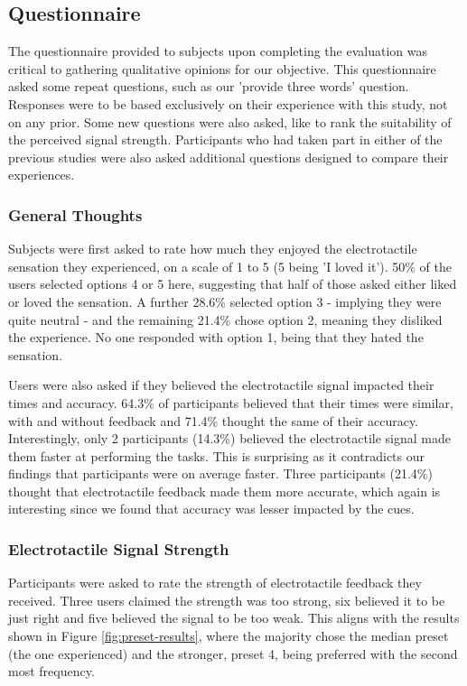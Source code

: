 \documentclass{mpaper}
\begin{document}
\subsection{Questionnaire} \label{subsec:questionnaire-3}
The questionnaire provided to subjects upon completing the evaluation was critical to gathering qualitative opinions for our objective. This questionnaire asked some repeat questions, such as our 'provide three words' question. Responses were to be based exclusively on their experience with this study, not on any prior. Some new questions were also asked, like to rank the suitability of the perceived signal strength. Participants who had taken part in either of the previous studies were also asked additional questions designed to compare their experiences.

\subsubsection{General Thoughts}

Subjects were first asked to rate how much they enjoyed the electrotactile sensation they experienced, on a scale of 1 to 5 (5 being 'I loved it'). 50\% of the users selected options 4 or 5 here, suggesting that half of those asked either liked or loved the sensation. A further 28.6\% selected option 3 - implying they were quite neutral - and the remaining 21.4\% chose option 2, meaning they disliked the experience. No one responded with option 1, being that they hated the sensation.

Users were also asked if they believed the electrotactile signal impacted their times and accuracy. 64.3\% of participants believed that their times were similar, with and without feedback and 71.4\% thought the same of their accuracy. Interestingly, only 2 participants (14.3\%) believed the electrotactile signal made them faster at performing the tasks. This is surprising as it contradicts our findings that participants were on average faster. Three participants (21.4\%) thought that electrotactile feedback made them more accurate, which again is interesting since we found that accuracy was lesser impacted by the cues.

\subsubsection{Electrotactile Signal Strength}
Participants were asked to rate the strength of electrotactile feedback they received. Three users claimed the strength was too strong, six believed it to be just right and five believed the signal to be too weak. This aligns with the results shown in Figure \ref{fig:preset-results}, where the majority chose the median preset (the one experienced) and the stronger, preset 4, being preferred with the second most frequency. 
\end{document}
